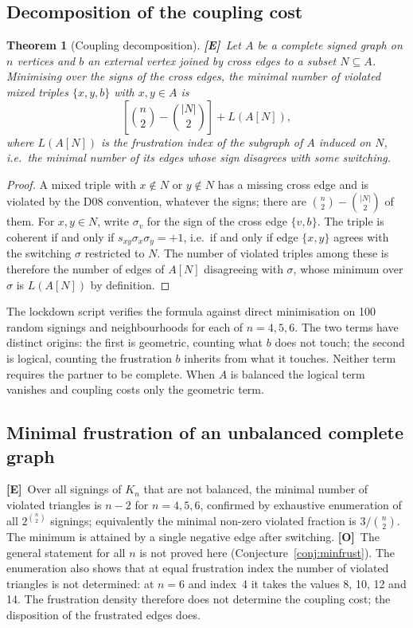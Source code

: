 \documentclass[11pt,a4paper]{article}
\theoremstyle{plain}
\newtheorem{theorem}{Theorem}[section]
\theoremstyle{definition}
\theoremstyle{remark}
\newcommand{\statE}{\textbf{[E]}}
\newcommand{\statO}{\textbf{[O]}}
\begin{document}
\subsection{Decomposition of the coupling cost}

\begin{theorem}[Coupling decomposition]\label{thm:coupling}
\statE\ Let $A$ be a complete signed graph on $n$ vertices and $b$ an external vertex joined by cross edges to a subset $N\subseteq A$. Minimising over the signs of the cross edges, the minimal number of violated mixed triples $\{x,y,b\}$ with $x,y\in A$ is
\[
\left[\binom{n}{2}-\binom{|N|}{2}\right]+L(A[N]),
\]
where $L(A[N])$ is the frustration index of the subgraph of $A$ induced on $N$, i.e.\ the minimal number of its edges whose sign disagrees with some switching.
\end{theorem}

\begin{proof}
A mixed triple with $x\notin N$ or $y\notin N$ has a missing cross edge and is violated by the D08 convention, whatever the signs; there are $\binom{n}{2}-\binom{|N|}{2}$ of them. For $x,y\in N$, write $\sigma_v$ for the sign of the cross edge $\{v,b\}$. The triple is coherent if and only if $s_{xy}\sigma_x\sigma_y=+1$, i.e.\ if and only if edge $\{x,y\}$ agrees with the switching $\sigma$ restricted to $N$. The number of violated triples among these is therefore the number of edges of $A[N]$ disagreeing with $\sigma$, whose minimum over $\sigma$ is $L(A[N])$ by definition.
\end{proof}

The lockdown script verifies the formula against direct minimisation on 100 random signings and neighbourhoods for each of $n=4,5,6$. The two terms have distinct origins: the first is geometric, counting what $b$ does not touch; the second is logical, counting the frustration $b$ inherits from what it touches. Neither term requires the partner to be complete. When $A$ is balanced the logical term vanishes and coupling costs only the geometric term.

\subsection{Minimal frustration of an unbalanced complete graph}

\statE\ Over all signings of $K_n$ that are not balanced, the minimal number of violated triangles is $n-2$ for $n=4,5,6$, confirmed by exhaustive enumeration of all $2^{\binom{n}{2}}$ signings; equivalently the minimal non-zero violated fraction is $3/\binom{n}{2}$. The minimum is attained by a single negative edge after switching. \statO\ The general statement for all $n$ is not proved here (Conjecture~\ref{conj:minfrust}). The enumeration also shows that at equal frustration index the number of violated triangles is not determined: at $n=6$ and index~4 it takes the values 8, 10, 12 and 14. The frustration density therefore does not determine the coupling cost; the disposition of the frustrated edges does.
\end{document}
